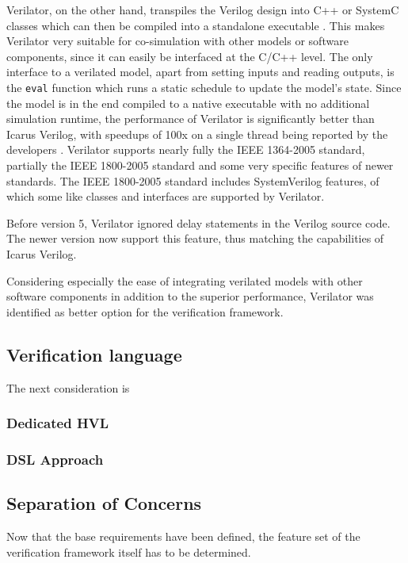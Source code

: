 \documentclass[12pt]{book}
\begin{document}
Verilator, on the other hand, transpiles the Verilog design into C++ or SystemC classes which can then be compiled
into a standalone executable \cite{verilator}. This makes Verilator very suitable for co-simulation with other models
or software components, since it can easily be interfaced at the C/C++ level. The only interface to a verilated
model, apart from setting inputs and reading outputs, is the \texttt{eval} function which runs a static schedule to
update the model's state. Since the model is in the end compiled to a native executable with no additional simulation
runtime, the performance of Verilator is significantly better than Icarus Verilog, with speedups of 100x on a single
thread being reported by the developers \cite{verilator}. Verilator supports nearly fully the IEEE 1364-2005
standard, partially the IEEE 1800-2005 standard and some very specific features of newer standards. The IEEE
1800-2005 standard includes SystemVerilog features, of which some like classes and interfaces are supported by Verilator.

Before version 5, Verilator ignored delay statements in the Verilog source code. The newer version now support this
feature, thus matching the capabilities of Icarus Verilog.

Considering especially the ease of integrating verilated models with other software components in addition to the
superior performance, Verilator was identified as better option for the verification framework.

\subsection{Verification language}
The next consideration is

\subsubsection{Dedicated HVL}

\subsubsection{DSL Approach}

\subsection{Separation of Concerns}
Now that the base requirements have been defined, the feature set of the verification framework itself has to be determined.
\end{document}
